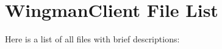 \section{Wingman\-Client File List}
Here is a list of all files with brief descriptions:\begin{CompactList}
\item{}
\end{CompactList}
